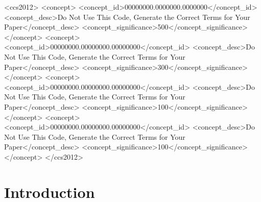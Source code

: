 \documentclass[acmsmall]{acmart}
\begin{document}
\begin{CCSXML}
<ccs2012>
 <concept>
  <concept_id>00000000.0000000.0000000</concept_id>
  <concept_desc>Do Not Use This Code, Generate the Correct Terms for Your Paper</concept_desc>
  <concept_significance>500</concept_significance>
 </concept>
 <concept>
  <concept_id>00000000.00000000.00000000</concept_id>
  <concept_desc>Do Not Use This Code, Generate the Correct Terms for Your Paper</concept_desc>
  <concept_significance>300</concept_significance>
 </concept>
 <concept>
  <concept_id>00000000.00000000.00000000</concept_id>
  <concept_desc>Do Not Use This Code, Generate the Correct Terms for Your Paper</concept_desc>
  <concept_significance>100</concept_significance>
 </concept>
 <concept>
  <concept_id>00000000.00000000.00000000</concept_id>
  <concept_desc>Do Not Use This Code, Generate the Correct Terms for Your Paper</concept_desc>
  <concept_significance>100</concept_significance>
 </concept>
</ccs2012>
\end{CCSXML}




\maketitle

\section{Introduction}

%
%
%
\end{document}
